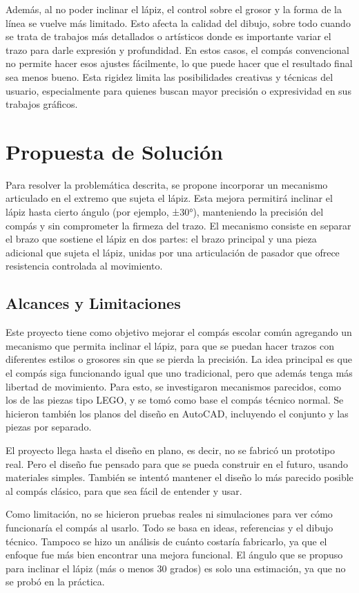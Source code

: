 \documentclass[11pt, a4paper]{article}
\begin{document}
Además, al no poder inclinar el lápiz, el control sobre el grosor y la forma de la línea se vuelve más limitado. Esto afecta la calidad del dibujo, sobre todo cuando se trata de trabajos más detallados o artísticos donde es importante variar el trazo para darle expresión y profundidad. En estos casos, el compás convencional no permite hacer esos ajustes fácilmente, lo que puede hacer que el resultado final sea menos bueno. Esta rigidez limita las posibilidades creativas y técnicas del usuario, especialmente para quienes buscan mayor precisión o expresividad en sus trabajos gráficos.

\section{Propuesta de Solución}
Para resolver la problemática descrita, se propone incorporar un mecanismo articulado en el extremo que sujeta el lápiz. Esta mejora permitirá inclinar el lápiz hasta cierto ángulo (por ejemplo, ±30°), manteniendo la precisión del compás y sin comprometer la firmeza del trazo. El mecanismo consiste en separar el brazo que sostiene el lápiz en dos partes: el brazo principal y una pieza adicional que sujeta el lápiz, unidas por una articulación de pasador que ofrece resistencia controlada al movimiento.

\subsection{Alcances y Limitaciones}
Este proyecto tiene como objetivo mejorar el compás escolar común agregando un mecanismo que permita inclinar el lápiz, para que se puedan hacer trazos con diferentes estilos o grosores sin que se pierda la precisión. La idea principal es que el compás siga funcionando igual que uno tradicional, pero que además tenga más libertad de movimiento. Para esto, se investigaron mecanismos parecidos, como los de las piezas tipo LEGO, y se tomó como base el compás técnico normal. Se hicieron también los planos del diseño en AutoCAD, incluyendo el conjunto y las piezas por separado.

El proyecto llega hasta el diseño en plano, es decir, no se fabricó un prototipo real. Pero el diseño fue pensado para que se pueda construir en el futuro, usando materiales simples. También se intentó mantener el diseño lo más parecido posible al compás clásico, para que sea fácil de entender y usar.

Como limitación, no se hicieron pruebas reales ni simulaciones para ver cómo funcionaría el compás al usarlo. Todo se basa en ideas, referencias y el dibujo técnico. Tampoco se hizo un análisis de cuánto costaría fabricarlo, ya que el enfoque fue más bien encontrar una mejora funcional. El ángulo que se propuso para inclinar el lápiz (más o menos 30 grados) es solo una estimación, ya que no se probó en la práctica.
\newpage
\end{document}
